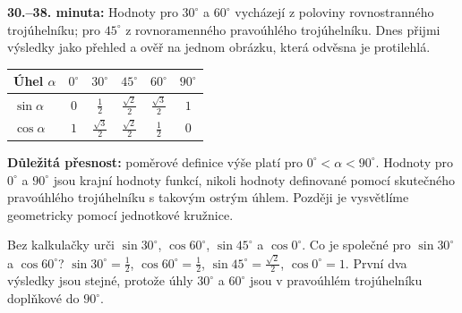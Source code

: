 \documentclass[11pt,a4paper]{article}
\begin{document}
\textbf{30.--38. minuta:} Hodnoty pro $30^\circ$ a $60^\circ$ vycházejí
z poloviny rovnostranného trojúhelníku; pro $45^\circ$ z
rovnoramenného pravoúhlého trojúhelníku. Dnes přijmi výsledky jako
přehled a ověř na jednom obrázku, která odvěsna je protilehlá.

\begin{center}
\renewcommand{\arraystretch}{1.42}
\begin{tabular}{@{}lccccc@{}}
\toprule
Úhel $\alpha$ & $0^\circ$ & $30^\circ$ & $45^\circ$ & $60^\circ$ & $90^\circ$ \\
\midrule
$\sin\alpha$ & $0$ & $\frac12$ & $\frac{\sqrt2}{2}$ & $\frac{\sqrt3}{2}$ & $1$ \\
$\cos\alpha$ & $1$ & $\frac{\sqrt3}{2}$ & $\frac{\sqrt2}{2}$ & $\frac12$ & $0$ \\
\bottomrule
\end{tabular}
\end{center}
\textbf{Důležitá přesnost:} poměrové definice výše platí
pro $0^\circ<\alpha<90^\circ$. Hodnoty pro $0^\circ$ a $90^\circ$
jsou krajní hodnoty funkcí, nikoli hodnoty definované pomocí
skutečného pravoúhlého trojúhelníku s takovým ostrým úhlem.
Později je vysvětlíme geometricky pomocí jednotkové kružnice.

\begin{prikladReseniBox}[title={P1: jak číst tabulku},breakable=false]
Bez kalkulačky urči $\sin30^\circ$, $\cos60^\circ$, $\sin45^\circ$
a $\cos0^\circ$. Co je společné pro $\sin30^\circ$ a $\cos60^\circ$?
\tcblower
$\sin30^\circ=\frac12$, $\cos60^\circ=\frac12$,
$\sin45^\circ=\frac{\sqrt2}{2}$, $\cos0^\circ=1$.
První dva výsledky jsou stejné, protože úhly $30^\circ$ a $60^\circ$
jsou v pravoúhlém trojúhelníku doplňkové do $90^\circ$.
\end{prikladReseniBox}
\end{document}
